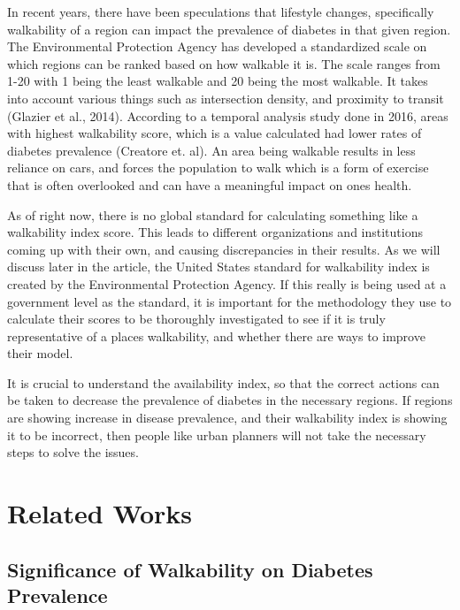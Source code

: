 \documentclass[
]{article}
\begin{document}
In recent years, there have been speculations that lifestyle changes,
specifically walkability of a region can impact the prevalence of
diabetes in that given region. The Environmental Protection Agency has
developed a standardized scale on which regions can be ranked based on
how walkable it is. The scale ranges from 1-20 with 1 being the least
walkable and 20 being the most walkable. It takes into account various
things such as intersection density, and proximity to transit (Glazier
et al., 2014). According to a temporal analysis study done in 2016,
areas with highest walkability score, which is a value calculated had
lower rates of diabetes prevalence (Creatore et. al). An area being
walkable results in less reliance on cars, and forces the population to
walk which is a form of exercise that is often overlooked and can have a
meaningful impact on ones health.

As of right now, there is no global standard for calculating something
like a walkability index score. This leads to different organizations
and institutions coming up with their own, and causing discrepancies in
their results. As we will discuss later in the article, the United
States standard for walkability index is created by the Environmental
Protection Agency. If this really is being used at a government level as
the standard, it is important for the methodology they use to calculate
their scores to be thoroughly investigated to see if it is truly
representative of a places walkability, and whether there are ways to
improve their model.

It is crucial to understand the availability index, so that the correct
actions can be taken to decrease the prevalence of diabetes in the
necessary regions. If regions are showing increase in disease
prevalence, and their walkability index is showing it to be incorrect,
then people like urban planners will not take the necessary steps to
solve the issues.

\section{Related Works}\label{related-works}

\subsection{Significance of Walkability on Diabetes
Prevalence}\label{significance-of-walkability-on-diabetes-prevalence}
\end{document}
